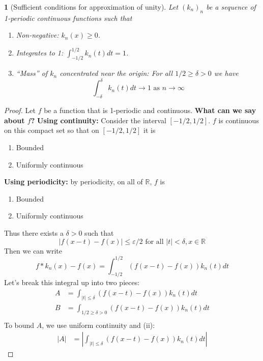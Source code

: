 \documentclass[11pt]{article}
\numberwithin{equation}{section}
\theoremstyle{plain}
\newtheorem{theorem}{\color{ForestGreen}{\textbf{Theorem}}}[section]
\theoremstyle{definition}
\newcommand\parens[1]{\left( #1 \right)}
\newcommand\abs[1]{\left| #1 \right|}
\newcommand{\1}{\mathbbm 1}
\def\d{\delta}
\newcommand{\e}{\varepsilon}
\newcommand{\RR}{\mathbb R}
\begin{document}
\begin{theorem}[Sufficient conditions for approximation of unity]
	Let $(k_n)_n$ be a sequence of 1-periodic continuous functions such that
	\begin{enumerate}
		\item Non-negative: $k_n(x) \geq 0$.
		\item Integrates to 1: $\int_{-1/2}^{1/2} k_n(t) dt = 1$.
		\item ``Mass'' of $k_n$ concentrated near the origin: For all $1/2 \geq \d > 0$ we have
		\begin{equation}
			\int_{-\d}^\d k_n(t) dt \to 1 \text{ as } n \to \infty
		\end{equation}
	\end{enumerate}
\end{theorem}
\begin{proof}
	Let $f$ be a function that is 1-periodic and continuous. \textbf{What can we say about $f$?} \textbf{Using continuity:} Consider the interval $[-1/2,1/2]$. $f$ is continuous on this compact set so that  on $[-1/2,1/2]$ it is
	\begin{enumerate}
		\item Bounded
		\item Uniformly continuous
	\end{enumerate}
	\textbf{Using periodicity:} by periodicity, on all of $\RR$, $f$ is 
	\begin{enumerate}
		\item Bounded
		\item Uniformly continuous
	\end{enumerate}
	Thus there exists a $\d > 0$ such that
	\begin{equation}
		\abs{f(x-t)-f(x)} \leq \e/2 \text{ for all } |t| < \d, x \in \RR
	\end{equation}
	Then we can write 
	\begin{equation}
		f * k_n(x) - f(x) = \int_{-1/2}^{1/2} \parens{f(x-t) - f(x)} k_n(t) dt 
	\end{equation}
	Let's break this integral up into two pieces:
	\begin{align*}
		A &= \int_{|t| \leq \d } \parens{f(x-t) - f(x)} k_n(t) dt \\
		B &= \int_{1/2 \geq \d > 0} \parens{f(x-t) - f(x)} k_n(t) dt \\
	\end{align*}
	To bound $A$, we use uniform continuity and (ii):
	\begin{align*}
		|A| &= \abs{\int_{|t| \leq \d } \parens{f(x-t) - f(x)} k_n(t) dt}
	\end{align*}
	
\end{proof} 
\end{document}
